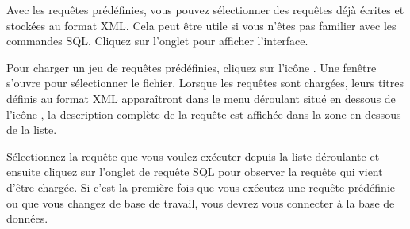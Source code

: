 \label{evis_predefined}


Avec les requêtes prédéfinies, vous pouvez sélectionner des requêtes déjà écrites et stockées au format XML. Cela peut être utile si vous n'êtes pas familier avec les commandes SQL. Cliquez sur l'onglet  pour afficher l'interface.


Pour charger un jeu de requêtes prédéfinies, cliquez sur l'icône . Une fenêtre s'ouvre pour sélectionner le fichier. Lorsque les requêtes sont chargées, leurs titres définis au format XML apparaîtront dans le menu déroulant situé en dessous de l'icône , la description complète de la requête est affichée dans la zone en dessous de la liste.


Sélectionnez la requête que vous voulez exécuter depuis la liste déroulante et ensuite cliquez sur l'onglet de requête SQL pour observer la requête qui vient d'être chargée. Si c'est la première fois que vous exécutez une requête prédéfinie ou que vous changez de base de travail, vous devrez vous connecter à la base de données.


